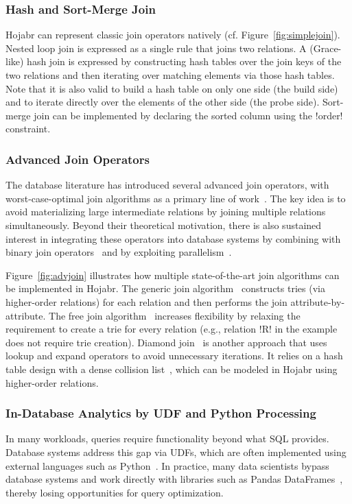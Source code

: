 \documentclass[sigconf,nonacm]{acmart}
\begin{document}
\subsubsection{Hash and Sort-Merge Join} 
Hojabr can represent classic join operators natively (cf. Figure~\ref{fig:simplejoin}). Nested loop join is expressed as a single rule that joins two relations. A (Grace-like) hash join is expressed by constructing hash tables over the join keys of the two relations and then iterating over matching elements via those hash tables. Note that it is also valid to build a hash table on only one side (the build side) and to iterate directly over the elements of the other side (the probe side). Sort-merge join can be implemented by declaring the sorted column using the !order! constraint.



\subsubsection{Advanced Join Operators} 
The database literature has introduced several advanced join operators, with worst-case-optimal join algorithms as a primary line of work~\cite{wcojalg1,wcojalg2,graphflow,emptyheaded,leapfrog,ngo2014skew}. The key idea is to avoid materializing large intermediate relations by joining multiple relations simultaneously. Beyond their theoretical motivation, there is also sustained interest in integrating these operators into database systems by combining with binary join operators~\cite{graphflow,kaboli2025unified,wang2023free} and by exploiting parallelism~\cite{freitag2020adopting,wu2025honeycomb}.

Figure~\ref{fig:advjoin} illustrates how multiple state-of-the-art join algorithms can be implemented in Hojabr. The generic join algorithm~\cite{ngo2014skew} constructs tries (via higher-order relations) for each relation and then performs the join attribute-by-attribute. The free join algorithm~\cite{wang2023free} increases flexibility by relaxing the requirement to create a trie for every relation (e.g., relation !R! in the example does not require trie creation). Diamond join~\cite{birler2024robust} is another approach that uses lookup and expand operators to avoid unnecessary iterations. It relies on a hash table design with a dense collision list~\cite{birler2024simple}, which can be modeled in Hojabr using higher-order relations.



\subsubsection{In-Database Analytics by UDF and Python Processing} 
In many workloads, queries require functionality beyond what SQL provides. Database systems address this gap via UDFs, which are often implemented using external languages such as Python~\cite{foufoulas2023efficient}. In practice, many data scientists bypass database systems and work directly with libraries such as Pandas DataFrames~\cite{pandas}, thereby losing opportunities for query optimization.
\end{document}
